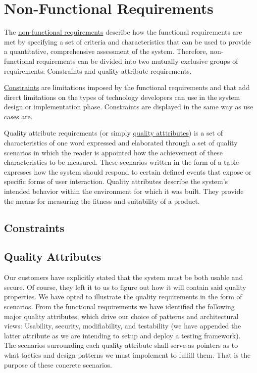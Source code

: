 \section{Non-Functional Requirements}

The \underline{non-functional requirements} describe how the functional requirements are met by specifying a set of criteria and characteristics that can be used to provide a quantitative, comprehensive assessment of the system. Therefore, non-functional requirements can be divided into two mutually exclusive groups of requirements: Constraints and quality attribute requirements.\par

\underline{Constraints} are limitations imposed by the functional requirements and that add direct limitations on the types of technology developers can use in the system design or implementation phase. Constraints are displayed in the same way as use cases are.\par

Quality attribute requirements (or simply \underline{quality atttributes}) is a set of characteristics of one word expressed and elaborated through a set of quality scenarios in which the reader is appointed how the achievement of these characteristics to be measured. These scenarios written in the form of a table expresses how the system should respond to certain defined events that expose or specific forms of user interaction. Quality attributes describe the system’s intended behavior within the environment for which it was built. They provide the means for measuring the fitness and suitability of a product.\par

\subsection{Constraints}


\subsection{Quality Attributes}

Our customers have explicitly stated that the system must be both usable and secure. Of course, they left it to us to figure out how it will contain said quality properties. We have opted to illustrate the quality requirements in the form of scenarios. From the functional requirements we have identified the following major quality attributes, which drive our choice of patterns and architectural views: Usability, security, modifiability, and testability (we have appended the latter attribute as we are intending to setup and deploy a testing framework). The scenarios surrounding each quality attribute shall serve as pointers as to what tactics and design patterns we must impolement to fulfill them. That is the purpose of these concrete scenarios.

